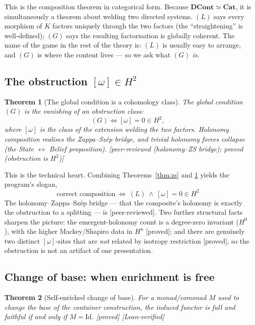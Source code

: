 \documentclass[11pt]{article}
\theoremstyle{plain}
\newtheorem{theorem}{Theorem}[section]
\theoremstyle{definition}
\theoremstyle{remark}
\newcommand{\DCont}{\mathbf{DCont}}
\newcommand{\Cat}{\mathbf{Cat}}
\newcommand{\omegacl}{[\omega]}
\newcommand{\HH}[1]{H^{#1}}
\newcommand{\Id}{\mathrm{Id}}
\newcommand{\grade}[1]{{\small\textsf{[#1]}}}
\newcommand{\gReviewed}{\grade{peer-reviewed}}   %
\newcommand{\gLean}{\grade{Lean-verified}}
\newcommand{\gProved}{\grade{proved}}
\begin{document}
This is the composition theorem in categorical form. Because $\DCont \simeq \Cat$, it is
simultaneously a theorem about welding two directed systems. $(L)$ says every morphism of
$K$ factors uniquely through the two factors (the ``straightening'' is well-defined);
$(G)$ says the resulting factorisation is globally coherent. The name of the game in the
rest of the theory is: $(L)$ is usually easy to arrange, and $(G)$ is where the content
lives --- so we ask what $(G)$ \emph{is}.

\subsection{The obstruction $\omegacl \in \HH{2}$}\label{sec:omega}

\begin{theorem}[The global condition is a cohomology class]\label{thm:omega}
The global condition $(G)$ is the vanishing of an obstruction class:
\[
  (G) \iff \omegacl = 0 \in \HH{2},
\]
where $\omegacl$ is the class of the extension welding the two factors. Holonomy
composition realises the Zappa--Sz\'ep bridge, and trivial holonomy forces collapse (the
State $\leftrightarrow$ Belief proposition). \grade{peer-reviewed (holonomy--ZS bridge);
proved (obstruction is $\HH{2}$)}
\end{theorem}

This is the technical heart. Combining Theorems~\ref{thm:zs} and \ref{thm:omega} yields
the program's slogan,
\[
  \boxed{\ \text{correct composition}\ \iff\ (L)\ \wedge\ \omegacl = 0 \in \HH{2}\ }
\]
The holonomy--Zappa--Sz\'ep bridge --- that the composite's holonomy is exactly the
obstruction to a splitting --- is \gReviewed{}. Two further structural facts sharpen the
picture: the emergent-holonomy count is a degree-zero invariant ($\HH{0}$), with the
higher Mackey/Shapiro data in $\HH{n}$ \gProved{}; and there are genuinely two distinct
$\omegacl$-sites that are \emph{not} related by isotropy restriction \gProved{}, so the
obstruction is not an artifact of one presentation.

\subsection{Change of base: when enrichment is free}\label{sec:cob}

\begin{theorem}[Self-enriched change of base]\label{thm:cob}
For a monad/comonad $M$ used to change the base of the container construction, the induced
functor is full and faithful if and only if $M = \Id$. \gProved{} \gLean{}
\end{theorem}
\end{document}
